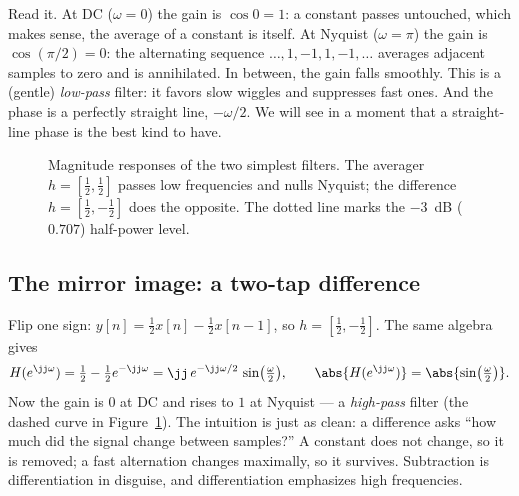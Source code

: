 Read it. At DC ($\omega=0$) the gain is $\cos 0 = 1$: a constant passes
untouched, which makes sense, the average of a constant is itself. At Nyquist
($\omega=\pi$) the gain is $\cos(\pi/2)=0$: the alternating sequence
$\dots,1,-1,1,-1,\dots$ averages adjacent samples to zero and is annihilated.
In between, the gain falls smoothly. This is a (gentle) \emph{low-pass} filter:
it favors slow wiggles and suppresses fast ones. And the phase is a perfectly
straight line, $-\omega/2$. We will see in a moment that a straight-line phase
is the best kind to have.

\begin{figure}[H]
\centering
{}
\caption{Magnitude responses of the two simplest filters. The averager
$h=[\tfrac12,\tfrac12]$ passes low frequencies and nulls Nyquist; the
difference $h=[\tfrac12,-\tfrac12]$ does the opposite. The dotted line marks the
$-3$~dB ($0.707$) half-power level.}
\label{ch14:fig-avg}
\end{figure}

\subsection{The mirror image: a two-tap difference}

Flip one sign: $y[n] = \tfrac12 x[n] - \tfrac12 x[n-1]$, so $h=[\tfrac12,-\tfrac12]$.
The same algebra gives
\[
  H(e^{\jj\omega}) = \tfrac12 - \tfrac12 e^{-\jj\omega}
   = \jj\,e^{-\jj\omega/2}\,\sin\!\big(\tfrac{\omega}{2}\big),
  \qquad
  \abs{H(e^{\jj\omega})} = \abs{\sin\!\big(\tfrac{\omega}{2}\big)}.
\]
Now the gain is $0$ at DC and rises to $1$ at Nyquist --- a \emph{high-pass}
filter (the dashed curve in Figure~\ref{ch14:fig-avg}). The intuition is just as
clean: a difference asks ``how much did the signal change between samples?'' A
constant does not change, so it is removed; a fast alternation changes maximally,
so it survives. Subtraction is differentiation in disguise, and differentiation
emphasizes high frequencies.

